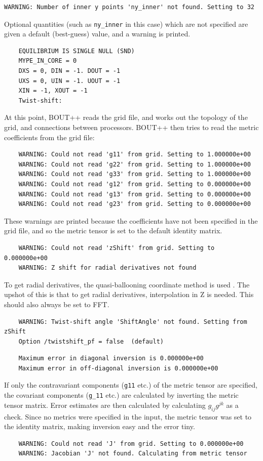 \documentclass[12pt]{article}
\newcommand{\code}[1]{\texttt{#1}}
\begin{document}
\begin{verbatim}
WARNING: Number of inner y points 'ny_inner' not found. Setting to 32
\end{verbatim}
Optional quantities (such as \code{ny\_inner} in this case) which
are not specified are given a default (best-guess) value, and a warning is printed.
\begin{verbatim}
	EQUILIBRIUM IS SINGLE NULL (SND) 
	MYPE_IN_CORE = 0
	DXS = 0, DIN = -1. DOUT = -1
	UXS = 0, UIN = -1. UOUT = -1
	XIN = -1, XOUT = -1
	Twist-shift: 
\end{verbatim}
At this point, BOUT++ reads the grid file, and works out the topology of the grid,
and connections between processors.
BOUT++ then tries to read the metric coefficients from the grid file:
\begin{verbatim}
	WARNING: Could not read 'g11' from grid. Setting to 1.000000e+00
	WARNING: Could not read 'g22' from grid. Setting to 1.000000e+00
	WARNING: Could not read 'g33' from grid. Setting to 1.000000e+00
	WARNING: Could not read 'g12' from grid. Setting to 0.000000e+00
	WARNING: Could not read 'g13' from grid. Setting to 0.000000e+00
	WARNING: Could not read 'g23' from grid. Setting to 0.000000e+00
\end{verbatim}

These warnings are printed because the coefficients have not been specified in the 
grid file, and so the metric tensor is set to the default identity matrix.

\begin{verbatim}
	WARNING: Could not read 'zShift' from grid. Setting to 0.000000e+00
	WARNING: Z shift for radial derivatives not found
\end{verbatim}
To get radial derivatives, the quasi-ballooning coordinate method is used
. 
The upshot of this is that to get radial derivatives,
interpolation in Z is needed. This should also always be set to FFT.

\begin{verbatim}
	WARNING: Twist-shift angle 'ShiftAngle' not found. Setting from zShift
	Option /twistshift_pf = false  (default)
\end{verbatim}

\begin{verbatim}
	Maximum error in diagonal inversion is 0.000000e+00
	Maximum error in off-diagonal inversion is 0.000000e+00
\end{verbatim}
If only the contravariant components (\code{g11} etc.) of the metric tensor are specified,
the covariant components (\code{g\_11} etc.) are calculated by inverting the metric tensor matrix. 
Error estimates are then calculated by calculating $g_{ij}g^{jk}$ as a check.
Since no metrics were specified in the input, the metric tensor was set to the identity
matrix, making inversion easy and the error tiny.
\begin{verbatim}
	WARNING: Could not read 'J' from grid. Setting to 0.000000e+00
	WARNING: Jacobian 'J' not found. Calculating from metric tensor
\end{verbatim}
\end{document}
